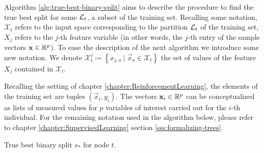 Algorithm \ref{alg:true-best-binary-split} aims to describe the procedure to
find the true best split for some $\mathcal{L}_t$, a subset of the training set.
Recalling some notation, $\mathcal{X}_t$ refers to the input space corresponding
to the partition $\mathcal{L}_t$ of the training set, $X_j$ refers to the $j$-th feature
variable (in other words, the $j$-th entry of the sample vectors $\mathbf{x} \in
\mathbb{R}^{p}$). To ease the description of the next algorithm we introduce some new
notation. We denote $\mathcal{X}_{t}^{j} \coloneqq \left\{ x_{j, o} \mid
\vec{x}_{o} \in \mathcal{X}_t \right\}$ the set of values of the feature $X_j$
contained in $\mathcal{X}_t$. 

Recalling the setting of chapter \ref{chapter:ReinforcementLearning}, the
elements of the training set are tuples $(\vec{x}_i, y_i)$. The vectors
$\mathbf{x}_i \in \mathbb{R}^{p}$ can be conceptualized as lists of measured values for $p$
variables of interest carried out for the $i$-th individual. For the remaining
notation used in the algorithm below, please refer to chapter
\ref{chapter:SupervisedLearning} section \ref{sss:formalizing-trees}.

\begin{algorithm}
    \caption[True best binary split for node $t$.]{True best binary split $s_*$ for node $t$.}
    \label{alg:true-best-binary-split}
\end{algorithm}

